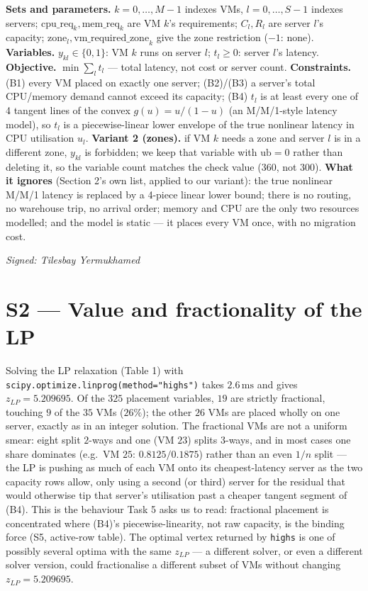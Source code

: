 \documentclass[11pt]{article}
\begin{document}
\begin{sloppypar}
\textbf{Sets and parameters.} $k=0,\dots,M{-}1$ indexes VMs, $l=0,\dots,S{-}1$ indexes servers;
$\text{cpu\_req}_k,\text{mem\_req}_k$ are VM $k$'s requirements; $C_l,R_l$ are server $l$'s
capacity; $\text{zone}_l,\text{vm\_required\_zone}_k$ give the zone restriction ($-1$: none).
\textbf{Variables.} $y_{kl}\in\{0,1\}$: VM $k$ runs on server $l$; $t_l\ge0$: server $l$'s
latency. \textbf{Objective.} $\min\sum_l t_l$ --- total latency, not cost or server count.
\textbf{Constraints.} (B1) every VM placed on exactly one server; (B2)/(B3) a server's total
CPU/memory demand cannot exceed its capacity; (B4) $t_l$ is at least every one of 4 tangent lines
of the convex $g(u)=u/(1-u)$ (an M/M/1-style latency model), so $t_l$ is a piecewise-linear lower
envelope of the true nonlinear latency in CPU utilisation $u_l$. \textbf{Variant 2 (zones).} if VM
$k$ needs a zone and server $l$ is in a different zone, $y_{kl}$ is forbidden; we keep that
variable with $\text{ub}=0$ rather than deleting it, so the variable count matches the check value
($360$, not $300$). \textbf{What it ignores} (Section 2's own list, applied to our variant): the
true nonlinear M/M/1 latency is replaced by a 4-piece linear lower bound; there is no routing, no
warehouse trip, no arrival order; memory and CPU are the only two resources modelled; and the
model is static --- it places every VM once, with no migration cost.
\end{sloppypar}

\vspace{4pt}\noindent\textit{Signed: Tilesbay Yermukhamed}

\section{S2 --- Value and fractionality of the LP}

Solving the LP relaxation (Table 1) with \texttt{scipy.optimize.linprog(method="highs")} takes
$2.6\,\text{ms}$ and gives $z_{LP}=5.209695$. Of the $325$ placement variables, $19$ are strictly
fractional, touching $9$ of the $35$ VMs ($26\%$); the other $26$ VMs are placed wholly on one
server, exactly as in an integer solution. The fractional VMs are not a uniform smear: eight split
$2$-ways and one (VM $23$) splits $3$-ways, and in most cases one share dominates (e.g.\ VM $25$:
$0.8125/0.1875$) rather than an even $1/n$ split --- the LP is pushing as much of each VM onto its
cheapest-latency server as the two capacity rows allow, only using a second (or third) server for
the residual that would otherwise tip that server's utilisation past a cheaper tangent segment of
(B4). This is the behaviour Task 5 asks us to read: fractional placement is concentrated where
(B4)'s piecewise-linearity, not raw capacity, is the binding force (S5, active-row table). The
optimal vertex returned by \texttt{highs} is one of possibly several optima with the same
$z_{LP}$ --- a different solver, or even a different solver version, could fractionalise a
different subset of VMs without changing $z_{LP}=5.209695$.
\end{document}
